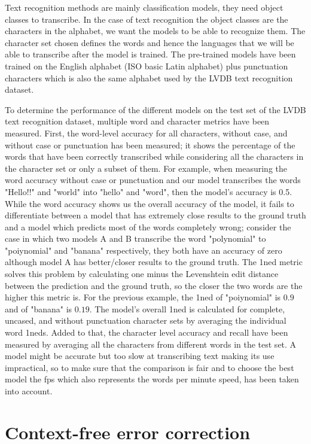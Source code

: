 Text recognition methods are mainly classification models, they need object classes to transcribe. In the case of text recognition the object classes are the characters in the alphabet, we want the models to be able to recognize them. The character set chosen defines the words and hence the languages that we will be able to transcribe after the model is trained. The pre-trained models have been trained on the English alphabet (ISO basic Latin alphabet) plus punctuation characters which is also the same alphabet used by the LVDB text recognition dataset.

To determine the performance of the different models on the test set of the LVDB text recognition dataset, multiple word and character metrics have been measured. First, the word-level accuracy for all characters, without case, and without case or punctuation has been measured; it shows the percentage of the words that have been correctly transcribed while considering all the characters in the character set or only a subset of them. For example, when measuring the word accuracy without case or punctuation and our model transcribes the words "Hello!!" and "world" into "hello" and "word", then the model's accuracy is 0.5. While the word accuracy shows us the overall accuracy of the model, it fails to differentiate between a model that has extremely close results to the ground truth and a model which predicts most of the words completely wrong; consider the case in which two models A and B transcribe the word "polynomial" to "poiynomial" and "banana" respectively, they both have an accuracy of zero although model A has better/closer results to the ground truth. The \gls{1ned} metric \cite{yujian_normalized_2007} solves this problem by calculating one minus the Levenshtein edit distance between the prediction and the ground truth, so the closer the two words are the higher this metric is. For the previous example, the \gls{1ned} of "poiynomial" is $0.9$ and of "banana" is $0.19$. The model's overall \gls{1ned} is calculated for complete, uncased, and without punctuation character sets by averaging the individual word \gls{1ned}s. Added to that, the character level accuracy and recall have been measured by averaging all the characters from different words in the test set. A model might be accurate but too slow at transcribing text making its use impractical, so to make sure that the comparison is fair and to choose the best model the \gls{fps} which also represents the words per minute speed, has been taken into account.

\section{Context-free error correction}

